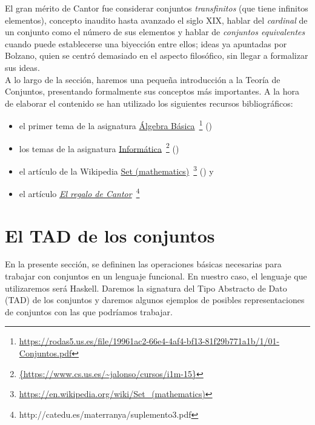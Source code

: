El gran mérito de Cantor fue considerar conjuntos \textit{transfinitos} (que
tiene infinitos elementos), concepto inaudito hasta avanzado el siglo XIX,
hablar del \textit{cardinal} de un conjunto como el número de sus elementos y
hablar de \textit{conjuntos equivalentes} cuando puede establecerse una
biyección entre ellos; ideas ya apuntadas por Bolzano, quien se centró
demasiado en el aspecto filosófico, sin llegar a formalizar sus ideas.\\


A lo largo de la sección, haremos una pequeña introducción a la Teoría de
Conjuntos, presentando formalmente sus conceptos más importantes. A la hora de 
elaborar el contenido se han utilizado los siguientes recursos bibliográficos:

\begin{itemize}
\item el primer tema de la asignatura
\href{https://rodas5.us.es/file/19961ac2-66e4-4af4-bf13-81f29b771a1b/1/01-Conjuntos.pdf}
     {Álgebra Básica}\
\footnote{\url{https://rodas5.us.es/file/19961ac2-66e4-4af4-bf13-81f29b771a1b/1/01-Conjuntos.pdf}}
(\cite{Algebra-15a})

\item los temas de la asignatura 
\href{https://www.cs.us.es/~jalonso/cursos/i1m-15}
     {Informática}\
\footnote{\url{{https://www.cs.us.es/~jalonso/cursos/i1m-15}}}
(\cite{Alonso-15a}) 
 
\item el artículo de la Wikipedia
\href{https://en.wikipedia.org/wiki/Set_(mathematics)}
     {Set (mathematics)}\
\footnote{\url{https://en.wikipedia.org/wiki/Set_(mathematics)}}
(\cite{Wikipedia-grafos}) y

\item el artículo
\href{http://catedu.es/materranya/suplemento3.pdf}
     {\textit{El regalo de Cantor}}\
\footnote{http://catedu.es/materranya/suplemento3.pdf}
\end{itemize}

\section{El TAD de los conjuntos}

\label{sec:TAD_conjuntos}

En la presente sección, se defininen las operaciones básicas necesarias
para trabajar con conjuntos en un lenguaje funcional. En nuestro caso, 
el lenguaje que utilizaremos será Haskell. Daremos la signatura del Tipo
Abstracto de Dato (TAD) de los conjuntos y daremos algunos ejemplos de 
posibles representaciones de conjuntos con las que podríamos trabajar.

